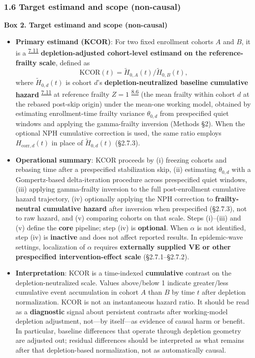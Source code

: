\documentclass[
]{article}
\providecommand{\tightlist}{%
  \setlength{\itemsep}{0pt}\setlength{\parskip}{0pt}}
\renewenvironment{quote}{\begin{mdframed}[style=kcorquote]}{\end{mdframed}}
\DeclareRobustCommand{\oldword}[1]{\leavevmode{\setbox0=\hbox{#1}\rlap{\raisebox{.5ex}{\rule{\wd0}{.45pt}}}\box0\relax}}
\begin{document}
\subsubsection{1.6 Target estimand and scope (non-causal)}\label{target-estimand-and-scope-non-causal}

\begin{quote}
\textbf{Box 2. Target estimand and scope (non-causal)}

\begin{itemize}
\tightlist
\item
  \textbf{Primary estimand (KCOR)}: For two fixed enrollment cohorts \(A\) and \(B\), it is a \textsuperscript{\hyperlink{issue-7.11}{7.11}} \oldword{\textbf{depletion-adjusted marginal estimand}} {\color{red} \textbf{depletion-adjusted cohort-level estimand on the reference-frailty scale}}, defined as \[\mathrm{KCOR}(t)=\tilde H_{0,A}(t)/\tilde H_{0,B}(t),\] where \(\tilde H_{0,d}(t)\) is cohort \(d\)'s \textbf{depletion-neutralized baseline cumulative hazard} \textsuperscript{\hyperlink{issue-7.11}{7.11}} {\color{red} at reference frailty \(Z=1\) \textsuperscript{\hyperlink{issue-8.6}{8.6}} {\color{red} (the mean frailty within cohort \(d\) at the rebased post-skip origin)} under the mean-one working model,} obtained by estimating enrollment-time frailty variance \(\theta_{0,d}\) from prespecified quiet windows and applying the gamma-frailty inversion (Methods §2). When the optional NPH cumulative correction is used, the same ratio employs \(H_{\mathrm{corr},d}(t)\) in place of \(\tilde H_{0,d}(t)\) (§2.7.3).
\item
  \textbf{Operational summary}: KCOR proceeds by (i) freezing cohorts and rebasing time after a prespecified stabilization skip, (ii) estimating \(\theta_{0,d}\) with a Gompertz-based delta-iteration procedure across prespecified quiet windows, (iii) applying gamma-frailty inversion to the full post-enrollment cumulative hazard trajectory, (iv) optionally applying the NPH correction to \textbf{frailty-neutral cumulative hazard} after inversion when prespecified (§2.7.3), not to raw hazard, and (v) comparing cohorts on that scale. Steps (i)--(iii) and (v) define the \textbf{core} pipeline; step (iv) is \textbf{optional}. When \(\alpha\) is not identified, step (iv) is \textbf{inactive} and does not affect reported results. In epidemic-wave settings, localization of \(\alpha\) requires \textbf{externally supplied VE or other prespecified intervention-effect scale} (§2.7.1--§2.7.2).
\item
  \textbf{Interpretation}: KCOR is a time-indexed \textbf{cumulative} contrast on the depletion-neutralized scale. Values above/below 1 indicate greater/less cumulative event accumulation in cohort \(A\) than \(B\) by time \(t\) after depletion normalization. KCOR is not an instantaneous hazard ratio. It should be read as a \textbf{diagnostic} signal about persistent contrasts after working-model depletion adjustment, not---by itself---as evidence of causal harm or benefit. In particular, baseline differences that operate through depletion geometry are adjusted out; residual differences should be interpreted as what remains after that depletion-based normalization, not as automatically causal.

\end{itemize}
\end{quote}
\end{document}
